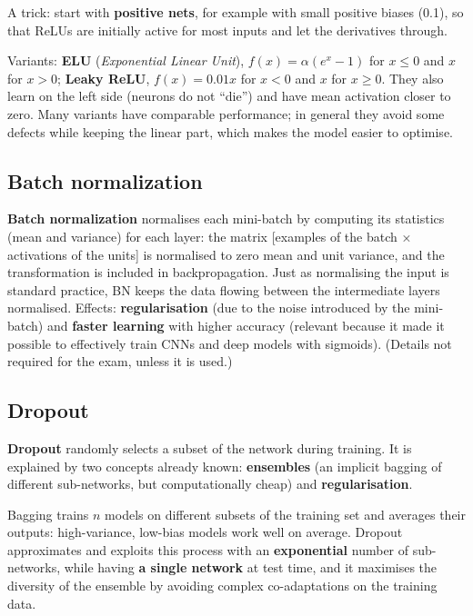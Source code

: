 A trick: start with \textbf{positive nets}, for example with small
positive biases (0.1), so that ReLUs are initially active for most
inputs and let the derivatives through.

Variants: \textbf{ELU} (\emph{Exponential Linear Unit}),
\(f(x) = \alpha(e^x - 1)\) for \(x \le 0\) and \(x\) for \(x > 0\);
\textbf{Leaky ReLU}, \(f(x) = 0.01x\) for \(x < 0\) and \(x\) for
\(x \ge 0\). They also learn on the left side (neurons do not ``die'')
and have mean activation closer to zero. Many variants have comparable
performance; in general they avoid some defects while keeping the
linear part, which makes the model easier to optimise.

\subsection{Batch normalization}\label{batch-normalization}

\textbf{Batch normalization} normalises each mini-batch by computing
its statistics (mean and variance) for each layer: the matrix
{[}examples of the batch × activations of the units{]} is normalised to
zero mean and unit variance, and the transformation is included in
backpropagation. Just as normalising the input is standard practice,
BN keeps the data flowing between the intermediate layers normalised.
Effects: \textbf{regularisation} (due to the noise introduced by the
mini-batch) and \textbf{faster learning} with higher accuracy (relevant
because it made it possible to effectively train CNNs and deep models
with sigmoids). (Details not required for the exam, unless it is
used.)

\subsection{Dropout}\label{dropout}

\textbf{Dropout} randomly selects a subset of the network during
training. It is explained by two concepts already known:
\textbf{ensembles} (an implicit bagging of different sub-networks, but
computationally cheap) and \textbf{regularisation}.

Bagging trains \(n\) models on different subsets of the training set
and averages their outputs: high-variance, low-bias models work well on
average. Dropout approximates and exploits this process with an
\textbf{exponential} number of sub-networks, while having \textbf{a
single network} at test time, and it maximises the diversity of the
ensemble by avoiding complex co-adaptations on the training data.

